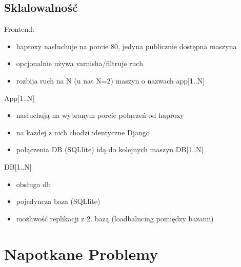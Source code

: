 \documentclass{beamer}
\begin{document}
\subsection{Sklalowalność}
  \begin{frame}
    \begin{block}{Frontend:}
      \begin{itemize}
        \item haproxy nasłuchuje na porcie 80, jedyna publicznie dostępna maszyna
        \item opcjonalnie używa varnisha/filtruje ruch
        \item rozbija ruch na N (u nas N=2) maszyn o nazwach app[1..N]
      \end{itemize}
    \end{block}
  \end{frame}
  \begin{frame}
    \begin{block}{App[1..N]}
      \begin{itemize}
        \item nasłuchują na wybranym porcie połączeń od haproxy
        \item na każdej z nich chodzi identyczne Django
        \item połączenia DB (SQLlite) idą do kolejnych maszyn DB[1..N]
      \end{itemize}
    \end{block}
  \end{frame}
  \begin{frame}
    \begin{block}{DB[1..N]}
      \begin{itemize}
        \item obsługa db
        \item pojedyncza baza (SQLlite)
        \item możliwość replikacji z 2. bazą (loadbalncing pomiędzy bazami)
      \end{itemize}
    \end{block}
  \end{frame}
\section{Napotkane Problemy}
\end{document}
